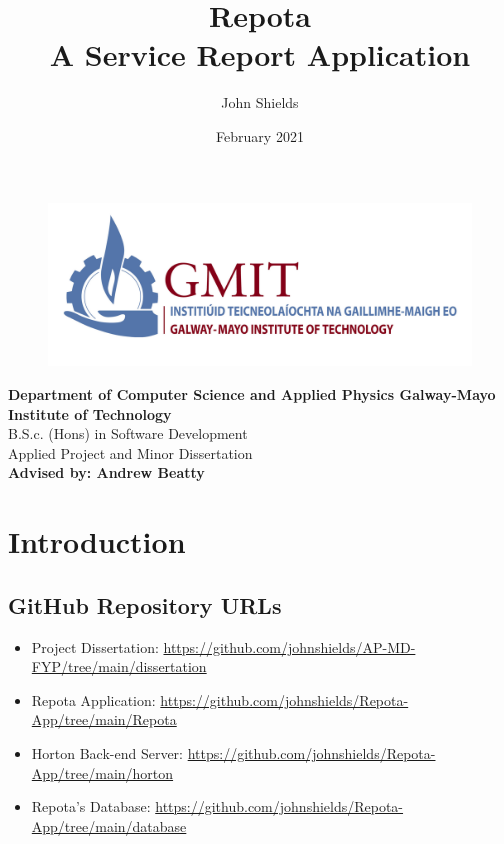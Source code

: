 \documentclass{article}
\title{\huge{\textbf{Repota}} \\
\LARGE{A Service Report Application}}
\author{John Shields}
\date{February 2021}
\begin{document}
\clearpage\maketitle
\thispagestyle{empty}
\begin{center}
    \begin{figure}[h]
        \centering
        \includegraphics[width=15cm]{images/logo-gmit.png}
        \label{fig:logo}
    \end{figure}
    \textbf{Department of Computer Science and Applied Physics Galway-Mayo Institute of Technology}\\
    B.S.c. (Hons) in Software Development
    \bigskip
    \\ Applied Project and Minor Dissertation \\
    \textbf{Advised by: Andrew Beatty}
    
\end{center}
\newpage
\setcounter{page}{1}
\tableofcontents
\listoffigures

\newpage
{} %

\section{Introduction}

\subsection{GitHub Repository URLs}
\begin{itemize}
    \item Project Dissertation: \url{https://github.com/johnshields/AP-MD-FYP/tree/main/dissertation} 
    \item Repota Application: \url{https://github.com/johnshields/Repota-App/tree/main/Repota}
    \item Horton Back-end Server: \url{https://github.com/johnshields/Repota-App/tree/main/horton} 
    \item Repota's Database: \url{https://github.com/johnshields/Repota-App/tree/main/database} 
\end{itemize}
\end{document}
